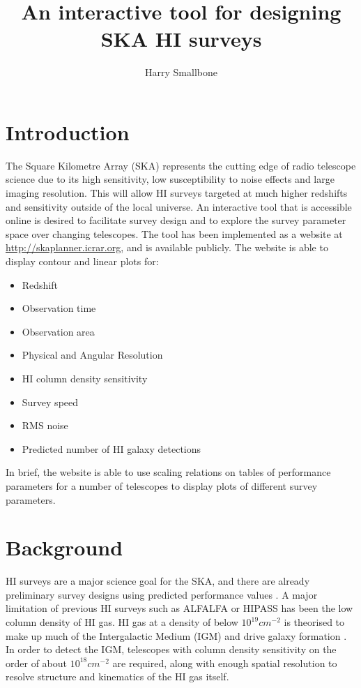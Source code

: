 \documentclass[11pt]{article}
\title{An interactive tool for designing SKA HI surveys}
\author{Harry Smallbone}
\begin{document}
\maketitle

\section{Introduction}

The Square Kilometre Array (SKA) represents the cutting edge of radio telescope science due to its high sensitivity, low susceptibility to noise effects and large imaging resolution. This will allow HI surveys targeted at much higher redshifts and sensitivity outside of the local universe. An interactive tool that is accessible online is desired to facilitate survey design and to explore the survey parameter space over changing telescopes. The tool has been implemented as a website at \url{http://skaplanner.icrar.org}, and is available publicly. The website is able to display contour and linear plots for: 
\begin{itemize}
\item Redshift
\item Observation time
\item Observation area
\item Physical and Angular Resolution
\item HI column density sensitivity
\item Survey speed
\item RMS noise
\item Predicted number of HI galaxy detections
\end{itemize}
In brief, the website is able to use scaling relations on tables of performance parameters for a number of telescopes to display plots of different survey parameters. 

\section{Background}
HI surveys are a major science goal for the SKA, and there are already preliminary survey designs using predicted performance values \parencite{lister2015}. A major limitation of previous HI surveys such as ALFALFA \parencite{alfalfa} or HIPASS \parencite{hipass2003, hipass2005} has been the low column density of HI gas. HI gas at a density of below $10^{19} cm^{-2}$ is theorised to make up much of the Intergalactic Medium (IGM) and drive galaxy formation \parencite{popping2014}. In order to detect the IGM, telescopes with column density sensitivity on the order of about $ 10^{18} cm^{-2} $ are required, along with enough spatial resolution to resolve structure and kinematics of the HI gas itself.
\end{document}

